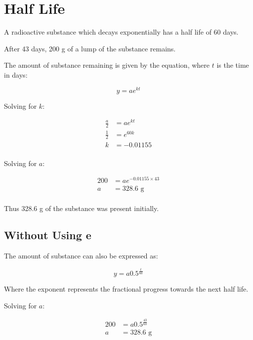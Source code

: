 \documentclass[a4paper,11pt]{article}
\begin{document}
\section{Half Life}

A radioactive substance which decays exponentially has a half life of 60 days.

After 43 days, 200 g of a lump of the substance remains.

The amount of substance remaining is given by the equation, where $t$ is the
time in days:

$$
y = a e^{kt}
$$

Solving for $k$:

$$
\begin{aligned}
\frac{a}{2} & = a e^{kt} \\
\frac{1}{2} & = e^{60k} \\
k & = -0.01155 \\
\end{aligned}
$$

Solving for $a$:

$$
\begin{aligned}
200 & = a e^{-0.01155 \times 43} \\
a & = 328.6\text{ g} \\
\end{aligned}
$$

Thus 328.6 g of the substance was present initially.


\subsection{Without Using e}

The amount of substance can also be expressed as:

$$
y = a 0.5^{\frac{t}{60}}
$$

Where the exponent represents the fractional progress towards the next half
life.

Solving for $a$:

$$
\begin{aligned}
200 & = a 0.5^{\frac{43}{60}} \\
a & = 328.6\text{ g} \\
\end{aligned}
$$
\end{document}
